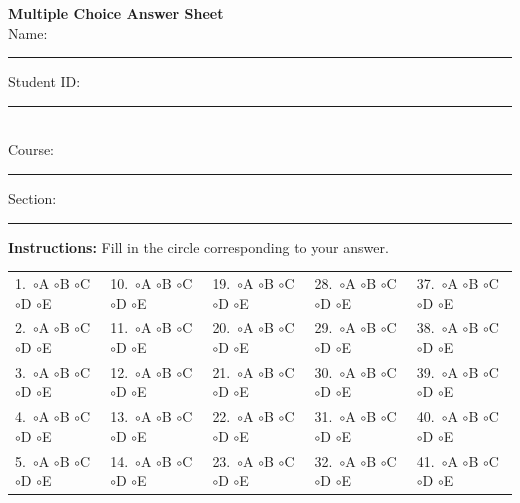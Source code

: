 \documentclass[12pt]{article}
\newcommand{\bubble}{\Large$\circ$}
\begin{document}
\begin{center}
{\Large \textbf{Multiple Choice Answer Sheet}}\\
\vspace{0.5em}
Name:\rule{6cm}{0.4pt} \hfill Student ID:\rule{4cm}{0.4pt}\\[0.6em]
Course:\rule{4cm}{0.4pt} \hfill Section:\rule{2cm}{0.4pt}
\end{center}

\vspace{1em}

\textbf{Instructions:} Fill in the circle corresponding to your answer.

\vspace{1em}

\begin{center}
\begin{tabular}{lllll}
1.\ \bubble A \bubble B \bubble C \bubble D \bubble E &
10.\ \bubble A \bubble B \bubble C \bubble D \bubble E &
19.\ \bubble A \bubble B \bubble C \bubble D \bubble E &
28.\ \bubble A \bubble B \bubble C \bubble D \bubble E &
37.\ \bubble A \bubble B \bubble C \bubble D \bubble E \\

2.\ \bubble A \bubble B \bubble C \bubble D \bubble E &
11.\ \bubble A \bubble B \bubble C \bubble D \bubble E &
20.\ \bubble A \bubble B \bubble C \bubble D \bubble E &
29.\ \bubble A \bubble B \bubble C \bubble D \bubble E &
38.\ \bubble A \bubble B \bubble C \bubble D \bubble E \\

3.\ \bubble A \bubble B \bubble C \bubble D \bubble E &
12.\ \bubble A \bubble B \bubble C \bubble D \bubble E &
21.\ \bubble A \bubble B \bubble C \bubble D \bubble E &
30.\ \bubble A \bubble B \bubble C \bubble D \bubble E &
39.\ \bubble A \bubble B \bubble C \bubble D \bubble E \\

4.\ \bubble A \bubble B \bubble C \bubble D \bubble E &
13.\ \bubble A \bubble B \bubble C \bubble D \bubble E &
22.\ \bubble A \bubble B \bubble C \bubble D \bubble E &
31.\ \bubble A \bubble B \bubble C \bubble D \bubble E &
40.\ \bubble A \bubble B \bubble C \bubble D \bubble E \\

5.\ \bubble A \bubble B \bubble C \bubble D \bubble E &
14.\ \bubble A \bubble B \bubble C \bubble D \bubble E &
23.\ \bubble A \bubble B \bubble C \bubble D \bubble E &
32.\ \bubble A \bubble B \bubble C \bubble D \bubble E &
41.\ \bubble A \bubble B \bubble C \bubble D \bubble E \\


\end{tabular}
\end{center}
\end{document}
